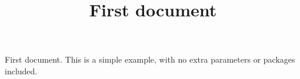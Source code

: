 \documentclass{article}
\title{First document}
\begin{document}
\maketitle


First document. This is a simple example, with no 
extra parameters or packages included.
\end{document}
